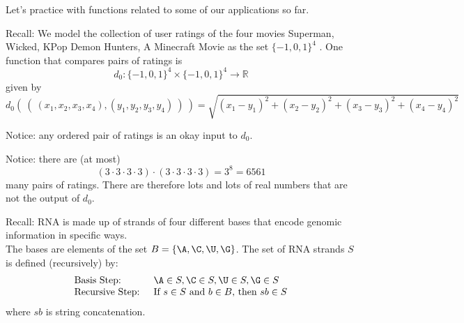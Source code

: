 
Let's practice with functions related to some of our applications so far.

Recall: We model the collection of user ratings of the four movies Superman, Wicked, KPop Demon Hunters, A Minecraft Movie as the set
$\{-1,0,1\}^4$ . One function that compares pairs of ratings is
$$d_0: \{-1,0,1\}^4 \times \{-1,0,1\}^4 \to \mathbb{R}$$
given by
\[
d_0 (~(~ (x_1, x_2, x_3, x_4), (y_1, y_2, y_3, y_4) ~) ~) = \sqrt{ (x_1 - y_1)^2 + (x_2 - y_2)^2 + (x_3 -y_3)^2 + (x_4 -y_4)^2}
\]

Notice: any ordered pair of ratings is an okay input to $d_0$.

Notice: there are (at most) 
\[
(3 \cdot 3 \cdot 3 \cdot 3)\cdot (3 \cdot 3 \cdot 3 \cdot 3) = 3^8 = 6561
\]
many pairs of ratings. There are therefore lots and lots of real numbers that are not the output of $d_0$.

\vfill

Recall: RNA is made up of strands of four different bases that encode genomic information
in specific ways.\\
The bases are elements of the set 
$B  = \{\A, \C, \U, \G \}$. The set of RNA strands $S$ is defined (recursively) by:
\[
\begin{array}{ll}
\textrm{Basis Step: } & \A \in S, \C \in S, \U \in S, \G \in S \\
\textrm{Recursive Step: } & \textrm{If } s \in S\textrm{ and }b \in B \textrm{, then }sb \in S
\end{array}
\]
where $sb$ is string concatenation.

\vfill

